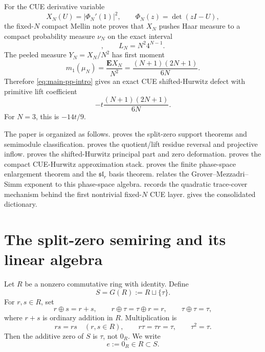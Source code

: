 \documentclass[11pt]{article}
\newcommand{\1}{\mathbf 1}
\numberwithin{equation}{section}
\begin{document}
For the CUE derivative variable
\begin{equation}
  X_N(U)=|\Phi_N'(1)|^2,
  \qquad \Phi_N(z)=\det(zI-U),
\end{equation}
the fixed-$N$ compact Mellin note proves that $X_N$ pushes Haar measure to a compact probability measure $\nu_N$ on the exact interval
\begin{equation}
  [0,L_N],\qquad L_N=N^2 4^{N-1}.
\end{equation}
The peeled measure $Y_N=X_N/N^2$ has first moment
\begin{equation}\label{eq:CUE-first-intro}
  m_1(\mu_N)=\frac{\mathbf E X_N}{N^2}
  =\frac{(N+1)(2N+1)}{6N}.
\end{equation}
Therefore \eqref{eq:main-pp-intro} gives an exact CUE shifted-Hurwitz defect with primitive lift coefficient
\begin{equation}
  -t\frac{(N+1)(2N+1)}{6N}.
\end{equation}
For $N=3$, this is $-14t/9$.

The paper is organized as follows.   proves the split-zero support theorems and semimodule classification.   proves the quotient/lift residue reversal and projective inflow.   proves the shifted-Hurwitz principal part and zero deformation.   proves the compact CUE-Hurwitz approximation stack.   proves the finite phase-space enlargement theorem and the $\mathfrak{sl}_r$ basis theorem.   relates the Grover--Mezzadri--Simm exponent to this phase-space algebra.   records the quadratic trace-cover mechanism behind the first nontrivial fixed-$N$ CUE layer.   gives the consolidated dictionary.

\section{The split-zero semiring and its linear algebra}\label{sec:split-zero}

Let $R$ be a nonzero commutative ring with identity.  Define
\begin{equation}
  S=G(R):=R\sqcup\{\tau\}.
\end{equation}
For $r,s\in R$, set
\begin{equation}\label{eq:addition-GR}
  r\oplus s=r+s,
  \qquad
  r\oplus\tau=\tau\oplus r=r,
  \qquad
  \tau\oplus\tau=\tau,
\end{equation}
where $r+s$ is ordinary addition in $R$.  Multiplication is
\begin{equation}\label{eq:multiplication-GR}
  rs=rs\quad(r,s\in R),
  \qquad
  r\tau=\tau r=\tau,
  \qquad
  \tau^2=\tau.
\end{equation}
Then the additive zero of $S$ is $\tau$, not $0_R$.  We write
\begin{equation}
  e:=0_R\in R\subset S.
\end{equation}
\end{document}
